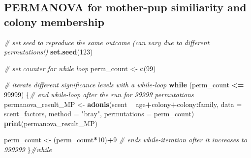 \documentclass[]{article}
\newenvironment{Shaded}{\begin{snugshade}}{\end{snugshade}}
\newcommand{\KeywordTok}[1]{\textcolor[rgb]{0.13,0.29,0.53}{\textbf{#1}}}
\newcommand{\DataTypeTok}[1]{\textcolor[rgb]{0.13,0.29,0.53}{#1}}
\newcommand{\DecValTok}[1]{\textcolor[rgb]{0.00,0.00,0.81}{#1}}
\newcommand{\StringTok}[1]{\textcolor[rgb]{0.31,0.60,0.02}{#1}}
\newcommand{\CommentTok}[1]{\textcolor[rgb]{0.56,0.35,0.01}{\textit{#1}}}
\newcommand{\ControlFlowTok}[1]{\textcolor[rgb]{0.13,0.29,0.53}{\textbf{#1}}}
\newcommand{\OperatorTok}[1]{\textcolor[rgb]{0.81,0.36,0.00}{\textbf{#1}}}
\newcommand{\NormalTok}[1]{#1}
\begin{document}
\subsection{PERMANOVA for mother-pup similiarity and colony
membership}\label{permanova-for-mother-pup-similiarity-and-colony-membership}

\begin{Shaded}
\begin{Highlighting}[]
\CommentTok{# set seed to reproduce the same outcome (can vary due to different permutations!)}
\KeywordTok{set.seed}\NormalTok{(}\DecValTok{123}\NormalTok{)}

\CommentTok{# set counter for while loop}
\NormalTok{perm_count <-}\StringTok{ }\KeywordTok{c}\NormalTok{(}\DecValTok{99}\NormalTok{)}

\CommentTok{# iterate different significance levels with a while-loop}
\ControlFlowTok{while}\NormalTok{ (perm_count }\OperatorTok{<=}\StringTok{ }\DecValTok{99999}\NormalTok{) \{}\CommentTok{# end while-loop after the run for 99999 permutations}
\NormalTok{  permanova_result_MP <-}\StringTok{ }\KeywordTok{adonis}\NormalTok{(scent }\OperatorTok{~}\StringTok{ }\NormalTok{age}\OperatorTok{+}\NormalTok{colony}\OperatorTok{+}\NormalTok{colony}\OperatorTok{:}\NormalTok{family, }
         \DataTypeTok{data =}\NormalTok{ scent_factors,}
         \DataTypeTok{method =} \StringTok{"bray"}\NormalTok{,}
         \DataTypeTok{permutations =}\NormalTok{ perm_count)}
  \KeywordTok{print}\NormalTok{(permanova_result_MP)}
  
\NormalTok{  perm_count <-}\StringTok{ }\NormalTok{(perm_count}\OperatorTok{*}\DecValTok{10}\NormalTok{)}\OperatorTok{+}\DecValTok{9} \CommentTok{# ends while-iteration after it increases to 999999}
\NormalTok{\}}\CommentTok{#while}
\end{Highlighting}
\end{Shaded}
\end{document}
